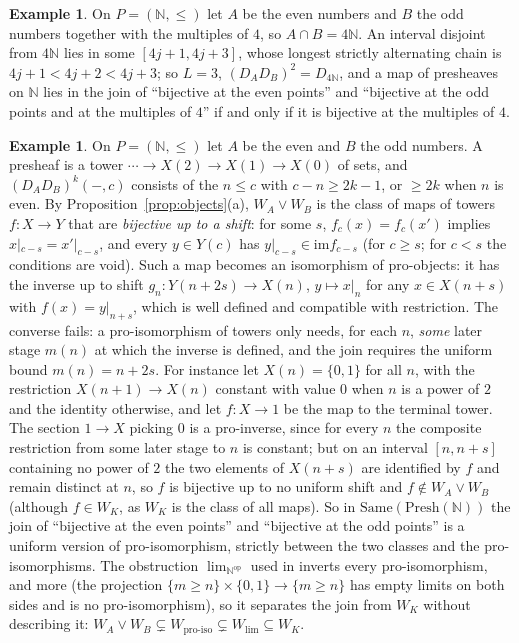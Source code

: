 \documentclass[11pt]{amsart}
\theoremstyle{definition}
\newtheorem{ex}[thm]{Example}
\newcommand{\Same}{\mathrm{Same}}
\newcommand{\Presh}{\mathrm{Presh}}
\newcommand{\im}{\mathrm{im}}
\begin{document}
\begin{ex}
On $P=(\mathbb N,\le)$ let $A$ be the even numbers and $B$ the odd numbers
together with the multiples of $4$, so $A\cap B=4\mathbb N$. An interval
disjoint from $4\mathbb N$ lies in some $[4j+1,4j+3]$, whose longest strictly
alternating chain is $4j+1<4j+2<4j+3$; so $L=3$, $(D_AD_B)^2=D_{4\mathbb N}$,
and a map of presheaves on $\mathbb N$ lies in the join of ``bijective at the
even points'' and ``bijective at the odd points and at the multiples of $4$''
if and only if it is bijective at the multiples of $4$.
\end{ex}

\begin{ex}\label{ex:pro}
On $P=(\mathbb N,\le)$ let $A$ be the even and $B$ the odd numbers. A presheaf
is a tower $\cdots\to X(2)\to X(1)\to X(0)$ of sets, and
$(D_AD_B)^k(-,c)$ consists of the $n\le c$ with $c-n\ge2k-1$, or $\ge2k$
when $n$ is even. By Proposition~\ref{prop:objects}(a), $W_A\vee W_B$ is the
class of maps of towers $f\colon X\to Y$ that are \emph{bijective up to a
shift}: for some $s$, $f_c(x)=f_c(x')$ implies $x|_{c-s}=x'|_{c-s}$, and every
$y\in Y(c)$ has $y|_{c-s}\in\im f_{c-s}$ (for $c\ge s$; for $c<s$ the
conditions are void). Such a map becomes an isomorphism of pro-objects: it
has the inverse up to shift $g_n\colon Y(n+2s)\to X(n)$, $y\mapsto x|_n$ for
any $x\in X(n+s)$ with $f(x)=y|_{n+s}$, which is well defined and compatible
with restriction. The converse fails: a pro-isomorphism of towers only needs,
for each $n$, \emph{some} later stage $m(n)$ at which the inverse is defined,
and the join requires the uniform bound $m(n)=n+2s$. For instance let
$X(n)=\{0,1\}$ for all $n$, with the restriction $X(n+1)\to X(n)$ constant
with value $0$ when $n$ is a power of $2$ and the identity otherwise, and let
$f\colon X\to1$ be the map to the terminal tower. The section $1\to X$
picking $0$ is a pro-inverse, since for every $n$ the composite restriction
from some later stage to $n$ is constant; but on an interval
$[n,n+s]$ containing no power of $2$ the two elements of $X(n+s)$ are
identified by $f$ and remain distinct at $n$, so $f$ is bijective up to no
uniform shift and $f\notin W_A\vee W_B$ (although $f\in W_K$, as $W_K$ is the
class of all maps). So in $\Same(\Presh(\mathbb N))$ the join of ``bijective
at the even points'' and ``bijective at the odd points'' is a uniform
version of pro-isomorphism, strictly between the two classes and the
pro-isomorphisms. The obstruction $\lim_{\mathbb N^{\mathrm{op}}}$ used in
\cite[Thm.~7.1]{Topjoin} inverts every pro-isomorphism, and more (the
projection $\{m\ge n\}\times\{0,1\}\to\{m\ge n\}$ has empty limits on both
sides and is no pro-isomorphism), so it separates the join from $W_K$
without describing it: $W_A\vee W_B\subsetneq W_{\text{pro-iso}}\subsetneq
W_{\lim}\subseteq W_K$.
\end{ex}
\end{document}
